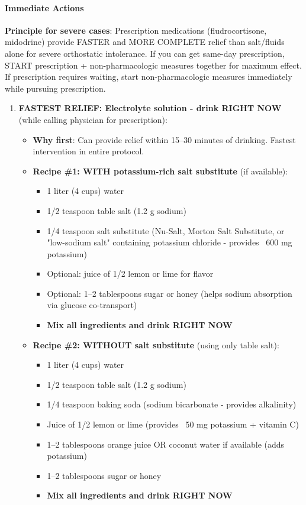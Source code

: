 \paragraph{Immediate Actions}

\textbf{Principle for severe cases}: Prescription medications (fludrocortisone, midodrine) provide FASTER and MORE COMPLETE relief than salt/fluids alone for severe orthostatic intolerance. If you can get same-day prescription, START prescription + non-pharmacologic measures together for maximum effect. If prescription requires waiting, start non-pharmacologic measures immediately while pursuing prescription.

\begin{enumerate}
    \item \textbf{FASTEST RELIEF: Electrolyte solution - drink RIGHT NOW} (while calling physician for prescription):
    \begin{itemize}
        \item \textbf{Why first}: Can provide relief within 15--30 minutes of drinking. Fastest intervention in entire protocol.

        \item \textbf{Recipe \#1: WITH potassium-rich salt substitute} (if available):
        \begin{itemize}
            \item 1 liter (4 cups) water
            \item 1/2 teaspoon table salt (1.2 g sodium)
            \item 1/4 teaspoon salt substitute (Nu-Salt, Morton Salt Substitute, or "low-sodium salt" containing potassium chloride - provides ~600 mg potassium)
            \item Optional: juice of 1/2 lemon or lime for flavor
            \item Optional: 1--2 tablespoons sugar or honey (helps sodium absorption via glucose co-transport)
            \item \textbf{Mix all ingredients and drink RIGHT NOW}
        \end{itemize}

        \item \textbf{Recipe \#2: WITHOUT salt substitute} (using only table salt):
        \begin{itemize}
            \item 1 liter (4 cups) water
            \item 1/2 teaspoon table salt (1.2 g sodium)
            \item 1/4 teaspoon baking soda (sodium bicarbonate - provides alkalinity)
            \item Juice of 1/2 lemon or lime (provides ~50 mg potassium + vitamin C)
            \item 1--2 tablespoons orange juice OR coconut water if available (adds potassium)
            \item 1--2 tablespoons sugar or honey
            \item \textbf{Mix all ingredients and drink RIGHT NOW}
        \end{itemize}


\end{itemize}
\end{enumerate}
